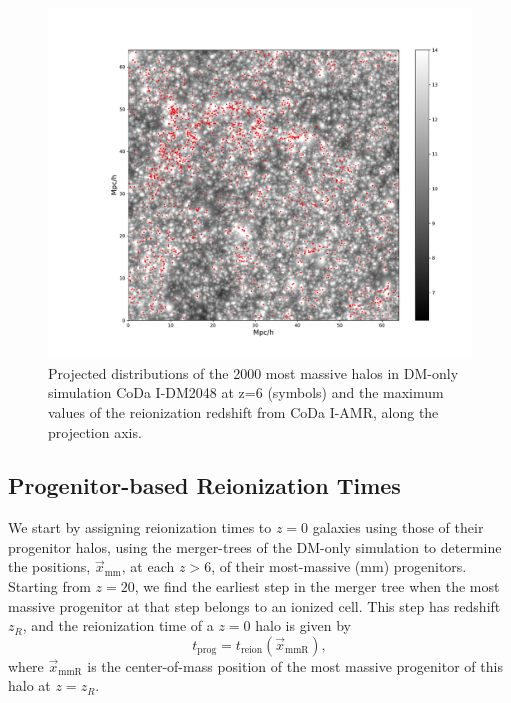 \documentclass[twocolumn]{aastex61}
\begin{document}
\begin{figure}[ht]
\begin{center}
\includegraphics[width=2.3 \columnwidth]{img/map_halo_final.pdf}
\caption{Projected distributions of the 2000 most massive halos in DM-only simulation CoDa I-DM2048 at z=6 (symbols) and the maximum values of the reionization redshift from CoDa I-AMR, along the projection axis.}
\end{center}
\label{fig:reion_halo_map}
\end{figure}


\subsection{Progenitor-based Reionization Times }
We start by assigning reionization times to $z = 0$ galaxies using those of their progenitor halos, using the merger-trees of the DM-only simulation to determine the positions, $ \vec x_\mathrm{mm}$, at each $z > 6$, of their most-massive (mm) progenitors. Starting from $z = 20$, we find the earliest step in the merger tree when the most massive progenitor at that step belongs to an ionized cell. This step has redshift $z_R$, and the reionization time of a $z = 0$ halo is given by
\begin{equation}
t_\mathrm{prog}=t_\mathrm{reion}(\vec x_\mathrm{mmR}),
\end{equation}
where $\vec x_\mathrm{mmR}$ is the center-of-mass position of the most massive progenitor of this halo at $z=z_R$.
\end{document}
